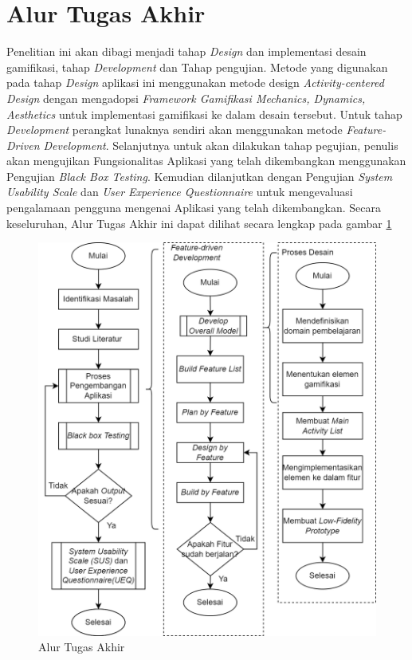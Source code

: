 \section{Alur Tugas Akhir}
Penelitian ini akan dibagi menjadi tahap \textit{Design} dan implementasi desain gamifikasi, tahap \textit{Development} dan Tahap pengujian.
Metode yang digunakan pada tahap \textit{Design} aplikasi ini menggunakan metode design \textit{Activity-centered Design} 
dengan mengadopsi \textit{Framework Gamifikasi Mechanics, Dynamics, Aesthetics} untuk implementasi gamifikasi ke dalam desain tersebut.
Untuk tahap \textit{Development} perangkat lunaknya sendiri akan menggunakan metode \textit{Feature-Driven Development}.
Selanjutnya untuk akan dilakukan tahap pegujian, penulis akan mengujikan Fungsionalitas Aplikasi yang telah dikembangkan menggunakan Pengujian \textit{Black Box Testing}.
Kemudian dilanjutkan dengan Pengujian \textit{System Usability Scale} dan \textit{User Experience Questionnaire} untuk mengevaluasi pengalamaan pengguna mengenai Aplikasi yang telah dikembangkan.
Secara keseluruhan, Alur Tugas Akhir ini dapat dilihat secara lengkap pada gambar \ref{Fig:Alur Tugas Akhir}
\begin{figure}[H]
	\centering
	\includegraphics[width=\textwidth-1cm]{contents/chapter-3/images/Alur-tugas-akhir-2.png}
	\caption[Caption]{Alur Tugas Akhir}
	\label{Fig:Alur Tugas Akhir}
\end{figure}
